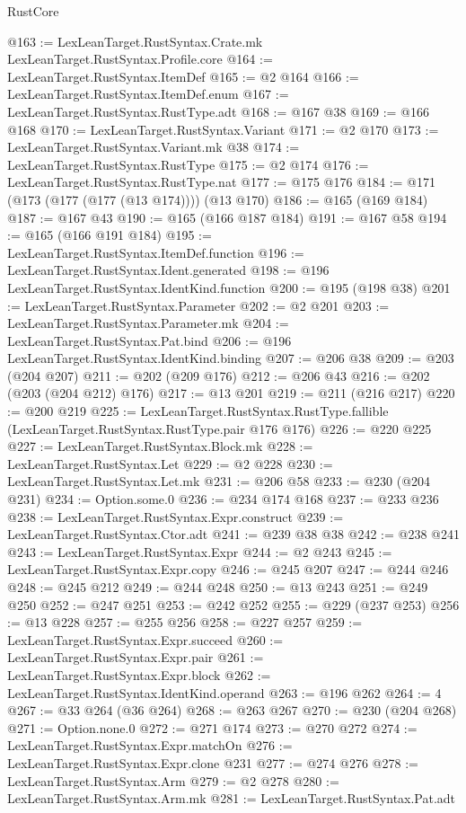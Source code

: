 \begin{lexlean}{RustCore}
\begin{coremodule}
{\begin{coremodule}
{{{{{{{@163 := LexLeanTarget.RustSyntax.Crate.mk LexLeanTarget.RustSyntax.Profile.core
@164 := LexLeanTarget.RustSyntax.ItemDef
@165 := @2 @164
@166 := LexLeanTarget.RustSyntax.ItemDef.enum
@167 := LexLeanTarget.RustSyntax.RustType.adt
@168 := @167 @38
@169 := @166 @168
@170 := LexLeanTarget.RustSyntax.Variant
@171 := @2 @170
@173 := LexLeanTarget.RustSyntax.Variant.mk @38
@174 := LexLeanTarget.RustSyntax.RustType
@175 := @2 @174
@176 := LexLeanTarget.RustSyntax.RustType.nat
@177 := @175 @176
@184 := @171 (@173 (@177 (@177 (@13 @174)))) (@13 @170)
@186 := @165 (@169 @184)
@187 := @167 @43
@190 := @165 (@166 @187 @184)
@191 := @167 @58
@194 := @165 (@166 @191 @184)
@195 := LexLeanTarget.RustSyntax.ItemDef.function
@196 := LexLeanTarget.RustSyntax.Ident.generated
@198 := @196 LexLeanTarget.RustSyntax.IdentKind.function
@200 := @195 (@198 @38)
@201 := LexLeanTarget.RustSyntax.Parameter
@202 := @2 @201
@203 := LexLeanTarget.RustSyntax.Parameter.mk
@204 := LexLeanTarget.RustSyntax.Pat.bind
@206 := @196 LexLeanTarget.RustSyntax.IdentKind.binding
@207 := @206 @38
@209 := @203 (@204 @207)
@211 := @202 (@209 @176)
@212 := @206 @43
@216 := @202 (@203 (@204 @212) @176)
@217 := @13 @201
@219 := @211 (@216 @217)
@220 := @200 @219
@225 := LexLeanTarget.RustSyntax.RustType.fallible
    (LexLeanTarget.RustSyntax.RustType.pair @176 @176)
@226 := @220 @225
@227 := LexLeanTarget.RustSyntax.Block.mk
@228 := LexLeanTarget.RustSyntax.Let
@229 := @2 @228
@230 := LexLeanTarget.RustSyntax.Let.mk
@231 := @206 @58
@233 := @230 (@204 @231)
@234 := Option.some.{0}
@236 := @234 @174 @168
@237 := @233 @236
@238 := LexLeanTarget.RustSyntax.Expr.construct
@239 := LexLeanTarget.RustSyntax.Ctor.adt
@241 := @239 @38 @38
@242 := @238 @241
@243 := LexLeanTarget.RustSyntax.Expr
@244 := @2 @243
@245 := LexLeanTarget.RustSyntax.Expr.copy
@246 := @245 @207
@247 := @244 @246
@248 := @245 @212
@249 := @244 @248
@250 := @13 @243
@251 := @249 @250
@252 := @247 @251
@253 := @242 @252
@255 := @229 (@237 @253)
@256 := @13 @228
@257 := @255 @256
@258 := @227 @257
@259 := LexLeanTarget.RustSyntax.Expr.succeed
@260 := LexLeanTarget.RustSyntax.Expr.pair
@261 := LexLeanTarget.RustSyntax.Expr.block
@262 := LexLeanTarget.RustSyntax.IdentKind.operand
@263 := @196 @262
@264 := 4
@267 := @33 @264 (@36 @264)
@268 := @263 @267
@270 := @230 (@204 @268)
@271 := Option.none.{0}
@272 := @271 @174
@273 := @270 @272
@274 := LexLeanTarget.RustSyntax.Expr.matchOn
@276 := LexLeanTarget.RustSyntax.Expr.clone @231
@277 := @274 @276
@278 := LexLeanTarget.RustSyntax.Arm
@279 := @2 @278
@280 := LexLeanTarget.RustSyntax.Arm.mk
@281 := LexLeanTarget.RustSyntax.Pat.adt
}}}}}}}
\end{coremodule}}
\end{coremodule}
\end{lexlean}
